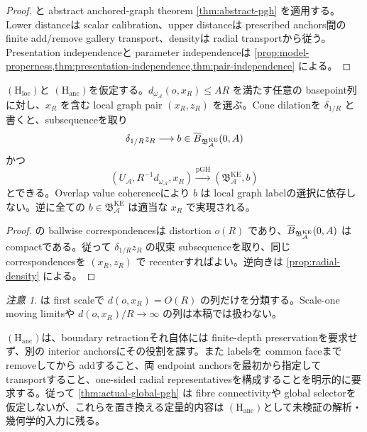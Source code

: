 \documentclass[11pt,a4paper]{ltjsarticle}
\newcommand{\cA}{\mathcal A}\newcommand{\cB}{\mathcal B}\newcommand{\cC}{\mathcal C}
\newcommand{\BKE}{\mathfrak B_{\cA}^{\mathrm{KE}}}
\newcommand{\Hloc}{\ensuremath{(\mathrm H_{\mathrm{loc}})}}
\newcommand{\Hanc}{\ensuremath{(\mathrm H_{\mathrm{anc}})}}
\theoremstyle{plain}
\theoremstyle{definition}
\theoremstyle{remark}
\newtheorem{remark}[theorem]{注意}\newtheorem{warning}[theorem]{警告}
\begin{document}
\begin{proof}
 と abstract anchored-graph theorem \cref{thm:abstract-pgh} を適用する。Lower distanceは scalar calibration、upper distanceは prescribed anchors間の finite add/remove gallery transport、densityは radial transportから従う。Presentation independenceと parameter independenceは \cref{prop:model-properness,thm:presentation-independence,thm:pair-independence} による。
\end{proof}

\begin{corollary}\label{cor:moving-basepoints}
\Hloc と \Hanc を仮定する。$d_{\omega_{\cA}}(o,x_R)\le AR$ を満たす任意の basepoint列に対し、$x_R$ を含む local graph pair $(x_R,z_R)$ を選ぶ。Cone dilationを $\delta_{1/R}$ と書くと、subsequenceを取り
\[
 \delta_{1/R}z_R\longrightarrow b\in\ov B_{\BKE}(0,A)
\]
かつ
\[
 (U_{\cA},R^{-1}d_{\omega_{\cA}},x_R)
 \xrightarrow{\mathrm{pGH}}(\BKE,b)
\]
とできる。Overlap value coherenceにより $b$ は local graph labelの選択に依存しない。逆に全ての $b\in\BKE$ は適当な $x_R$ で実現される。
\end{corollary}

\begin{proof}
 の ballwise correspondencesは distortion $o(R)$ であり、$\ov B_{\BKE}(0,A)$ は compactである。従って $\delta_{1/R}z_R$ の収束 subsequenceを取り、同じ correspondencesを $(x_R,z_R)$ で recenterすればよい。逆向きは \cref{prop:radial-density} による。
\end{proof}

\begin{remark}
 は first scaleで $d(o,x_R)=O(R)$ の列だけを分類する。Scale-one moving limitsや $d(o,x_R)/R\to\infty$ の列は本稿では扱わない。
\end{remark}

\begin{statusbox}
\Hanc は、boundary retractionそれ自体には finite-depth preservationを要求せず、別の interior anchorsにその役割を課す。また labelsを common faceまで removeしてから addすること、両 endpoint anchorsを最初から指定して transportすること、one-sided radial representativesを構成することを明示的に要求する。従って \cref{thm:actual-global-pgh} は fibre connectivityや global selectorを仮定しないが、これらを置き換える定量的内容は \Hanc として未検証の解析・幾何学的入力に残る。
\end{statusbox}
\end{document}
